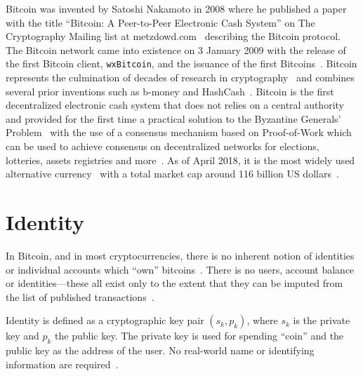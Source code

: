 Bitcoin was invented by Satoshi Nakamoto in 2008 where he published a paper with the title ``Bitcoin: A Peer-to-Peer Electronic Cash System'' on The Cryptography Mailing list at metzdowd.com~\cite{satoshi_mailing_list} describing the Bitcoin protocol. The Bitcoin network came into existence on 3 January 2009 with the release of the first Bitcoin client, \verb|wxBitcoin|, and the issuance of the first Bitcoins~\cite{btc_client, btc_first_block}. Bitcoin represents the culmination of decades of research in cryptography~\cite{antonopoulos2014mastering} and combines several prior inventions such as b-money and HashCash~\cite{antonopoulos2014mastering}. Bitcoin is the first decentralized electronic cash system that does not relies on a central authority and
provided for the first time a practical solution to the Byzantine Generals' Problem~\cite{byzantine_fault_tolerance} with the use of a consensus mechanism
based on Proof-of-Work which can be used to achieve consensus on decentralized networks for elections, lotteries, assets registries and more~\cite{antonopoulos2014mastering}. As of April 2018, it is the most widely used alternative currency~\cite{10.1007/978-3-642-39884-1_2} with a total market cap around 116 billion US dollars~\cite{btc_cap}.

\section{Identity}\label{blockchain:identity}

In Bitcoin, and in most cryptocurrencies, there is no inherent notion of identities or individual accounts which ``own'' bitcoins~\cite{7163021,nakamoto2012bitcoin}. There is no users, account balance or identities—these all exist only to the extent that they can be imputed from the list of published transactions~\cite{7163021,nakamoto2012bitcoin}.

Identity is defined as a cryptographic key pair $(s_k, p_k)$, where $s_k$ is the private key and $p_k$ the public key. The private key is used for spending ``coin'' and the public key as the address of the user. No real-world name or identifying information are required~\cite{7163021,nakamoto2012bitcoin}.

